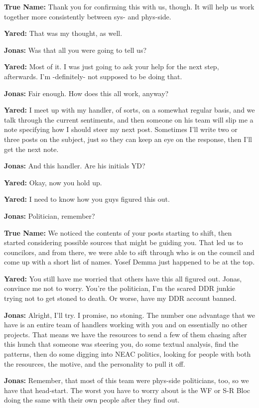 \textbf{True Name:} Thank you for confirming this with us, though. It will help us work together more consistently between sys- and phys-side.

\textbf{Yared:} That was my thought, as well.

\textbf{Jonas:} Was that all you were going to tell us?

\textbf{Yared:} Most of it. I was just going to ask your help for the next step, afterwards. I'm -definitely- not supposed to be doing that.

\textbf{Jonas:} Fair enough. How does this all work, anyway?

\textbf{Yared:} I meet up with my handler, of sorts, on a somewhat regular basis, and we talk through the current sentiments, and then someone on his team will slip me a note specifying how I should steer my next post. Sometimes I'll write two or three posts on the subject, just so they can keep an eye on the response, then I'll get the next note.

\textbf{Jonas:} And this handler. Are his initials YD?

\textbf{Yared:} Okay, now you hold up.

\textbf{Yared:} I need to know how you guys figured this out.

\textbf{Jonas:} Politician, remember?

\textbf{True Name:} We noticed the contents of your posts starting to shift, then started considering possible sources that might be guiding you. That led us to councilors, and from there, we were able to sift through who is on the council and come up with a short list of names. Yosef Demma just happened to be at the top.

\textbf{Yared:} You still have me worried that others have this all figured out. Jonas, convince me not to worry. You're the politician, I'm the scared DDR junkie trying not to get stoned to death. Or worse, have my DDR account banned.

\textbf{Jonas:} Alright, I'll try. I promise, no stoning. The number one advantage that we have is an entire team of handlers working with you and on essentially no other projects. That means we have the resources to send a few of them chasing after this hunch that someone was steering you, do some textual analysis, find the patterns, then do some digging into NEAC politics, looking for people with both the resources, the motive, and the personality to pull it off.

\textbf{Jonas:} Remember, that most of this team were phys-side politicians, too, so we have that head-start. The worst you have to worry about is the WF or S-R Bloc doing the same with their own people after they find out.

